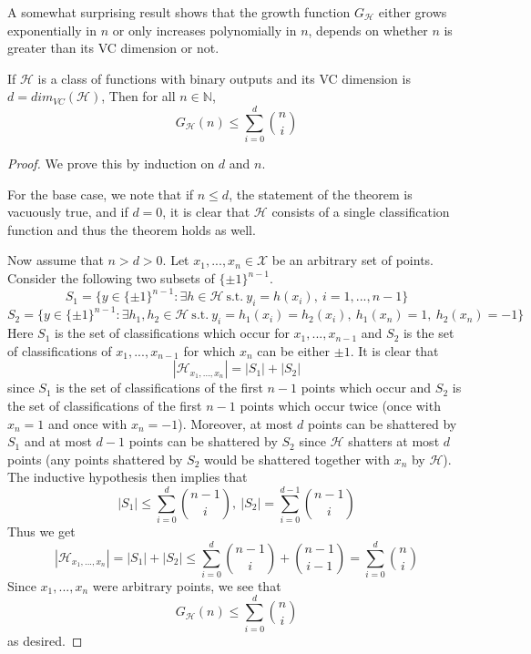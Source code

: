 A somewhat surprising result shows that the growth function $G_{\mathcal{H}}$ either grows exponentially in $n$ or only increases polynomially in $n$, depends on whether $n$ is greater than its VC dimension or not.
\begin{theorem}[Sauer]
	If $\mathcal{H}$ is a class of functions with binary outputs and its VC dimension is $d=dim_{VC}(\mathcal{H})$, Then for all $n \in \mathbb{N}$,
	\begin{equation}
	G_\mathcal{H}(n) \leq \sum_{i=0}^{d}\binom{n}{i}
	\end{equation}
\end{theorem}
\begin{proof}
 We prove this by induction on $d$ and $n$. 
 
 For the base case, we note that if $n \leq d$, the statement of the theorem is vacuously true, and if $d = 0$,
 it is clear that $\mathcal{H}$ consists of a single classification function and thus the theorem holds as well.
 
 Now assume that $n > d > 0$. Let $x_1,...,x_n\in \mathcal{X}$ be an arbitrary set of points. Consider the following
 two subsets of $\{\pm1\}^{n-1}$.
 \begin{equation}
  S_1 = \{y\in \{\pm 1\}^{n-1}:\exists h\in \mathcal{H}~\text{s.t.}~y_i = h(x_i),~i = 1,...,n-1\} 
 \end{equation}
  \begin{equation}
  S_2 = \{y\in \{\pm 1\}^{n-1}:\exists h_1, h_2\in \mathcal{H}~\text{s.t.}~y_i = h_1(x_i) = h_2(x_i),~h_1(x_n) = 1,~h_2(x_n) = -1\} 
 \end{equation}
 Here $S_1$ is the set of classifications which occur for $x_1,...,x_{n-1}$ and $S_2$ is the set of 
 classifications of $x_1,...,x_{n-1}$ for which $x_n$ can be either $\pm 1$. It is clear that
 \begin{equation}
  |\mathcal{H}_{x_1,...,x_n}| = |S_1| + |S_2|
 \end{equation}
 since $S_1$ is the set of classifications of the first $n-1$ points which occur and $S_2$ is the set of classifications
 of the first $n-1$ points which occur twice (once with $x_n = 1$ and once with $x_n = -1$). Moreover, at most $d$ points
 can be shattered by $S_1$ and at most $d-1$ points can be shattered by $S_2$ since $\mathcal{H}$ shatters at most $d$ points
 (any points shattered by $S_2$ would be shattered together with $x_n$ by $\mathcal{H}$). The inductive hypothesis then implies
 that
 \begin{equation}
  |S_1| \leq \sum_{i=0}^{d}\binom{n-1}{i},~|S_2| = \sum_{i=0}^{d-1}\binom{n-1}{i}
 \end{equation}
 Thus we get
 \begin{equation}
  |\mathcal{H}_{x_1,...,x_n}| = |S_1| + |S_2| \leq \sum_{i=0}^{d}\binom{n-1}{i} + \binom{n-1}{i-1} = \sum_{i=0}^{d}\binom{n}{i}
 \end{equation}
 Since $x_1,...,x_n$ were arbitrary points, we see that
 \begin{equation}
  G_\mathcal{H}(n) \leq \sum_{i=0}^{d}\binom{n}{i}
 \end{equation}
 as desired.
\end{proof}
